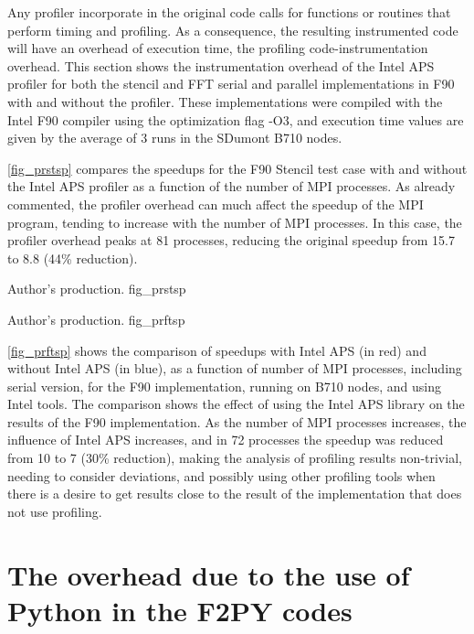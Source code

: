 Any profiler incorporate in the original code calls for functions or routines that perform timing and profiling. As a consequence, the resulting instrumented code will have an overhead of execution time, the profiling code-instrumentation overhead. This section shows the instrumentation overhead of the Intel APS profiler for both the stencil and FFT serial and parallel implementations in F90 with and without the profiler. These implementations were compiled with the Intel F90 compiler using the optimization flag -O3, and execution time values are given by the average of 3 runs in the SDumont B710 nodes.

\autoref {fig_prstsp} compares the speedups for the F90 Stencil test case with and without the Intel APS profiler as a function of the number of MPI processes. As already commented, the profiler overhead can much affect the speedup of the MPI program, tending to increase with the number of MPI processes. In this case, the profiler overhead peaks at 81 processes, reducing the original speedup from 15.7 to 8.8 (44\% reduction). 

     {Author's production.} {fig_prstsp}

     {Author's production.} {fig_prftsp}

\autoref {fig_prftsp} shows the comparison of speedups with Intel APS (in red) and without Intel APS (in blue), as a function of number of MPI processes, including serial version, for the F90 implementation, running on B710 nodes, and using Intel tools. The comparison shows the effect of using the Intel APS library on the results of the F90 implementation. As the number of MPI processes increases, the influence of Intel APS increases, and in 72 processes the speedup was reduced from 10 to 7 (30\% reduction), making the analysis of profiling results non-trivial, needing to consider deviations, and possibly using other profiling tools when there is a desire to get results close to the result of the implementation that does not use profiling.

%
%
%
\section{The overhead due to the use of Python in the F2PY codes}
\label{sec_ovhd}

